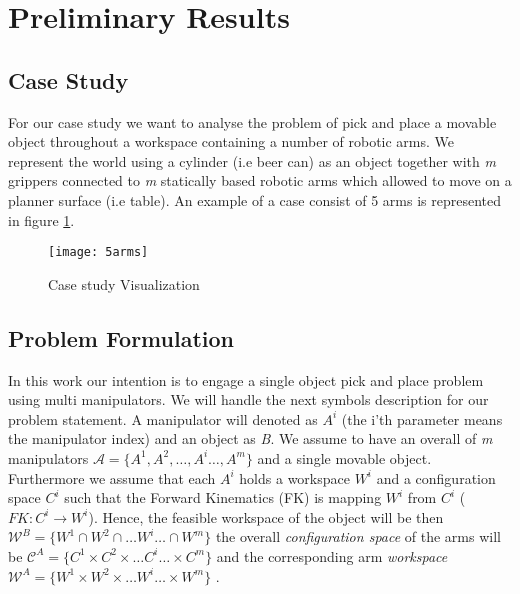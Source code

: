 
\section{Preliminary Results}


\subsection{Case Study}
For our case study we want to analyse the problem of pick and place a movable object throughout a workspace containing a number of robotic arms. We represent the world using a cylinder (i.e beer can) as an object together with \textit{m} grippers connected to \textit{m} statically based robotic arms which allowed to move on a planner surface (i.e table). An example of a case consist of 5 arms is represented in figure \ref{fig:case_study}.

\begin{figure}[htb]
\texttt{[image: 5arms]}
\centering
\caption{Case study Visualization} \label{fig:case_study}
\centering
\end{figure}


\subsection{Problem Formulation}
In this work our intention is to engage a single object pick and place problem using multi manipulators. We will handle the next symbols description for our problem statement. A manipulator will denoted as $A^{i}$ (the i'th parameter means the manipulator index) and an object as \textit{B}. We assume to have an overall of \textit{m} manipulators  $\mathcal{A}=\{A^{1},A^{2},\dots,A^i \dots,A^{m}\}$ and a single movable object. Furthermore we assume that each $A^i$ holds a workspace $W^{i}$ and a configuration space $C^{i}$ such that 
the Forward Kinematics (FK) is mapping $W^i$ from $C^i$ ($FK:C^i\rightarrow W^i$). Hence, the feasible workspace of the object will be then $\mathcal{W}^B=\{W^{1} \cap W^{2} \cap \dots  W^{i} \dots \cap W^{m} \}$ the overall \textit{configuration space} of the arms will be $\mathcal{C}^A=\{C^{1} \times C^{2} \times \dots  C^{i}  \dots \times C^{m} \}$  and the corresponding arm \textit{workspace} $\mathcal{W}^A=\{W^{1} \times W^{2} \times \dots  W^{i}  \dots \times W^{m} \}$ . 


